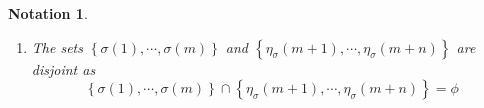 \documentclass[aps,preprint]{revtex4}%
\newtheorem{definition}[theorem]{Definition}
\newtheorem{notation}[theorem]{Notation}
\begin{document}
\begin{notation}
\begin{enumerate}
\begin{definition}
Disjoint Combinations $DC_{m,n}^{r}$ is the set of $n$-permutations $\sigma$
that produce \emph{disjoint sets} of $m$ \emph{ordered} objects $\left\{
\sigma\left(  1\right)  ,\cdots,\sigma\left(  m\right)  \right\}  $and $n$
\emph{ordered} objects $\left\{  \sigma\left(  m+1\right)  ,\cdots
,\sigma\left(  m+n\right)  \right\}  $ selected from a set of \emph{ordered}
$r$ objects and is defined by
\begin{align}
DC_{m,n}^{r}\left\{  \left\{  1,\cdots,r\right\}  \right\}   &  =\left\{
\left.  \overset{}{\left\{  \overset{}{\sigma\left(  1\right)  ,\cdots
,\sigma\left(  m\right)  }\right\}  ,\left\{  \overset{}{\left\{
1,\cdots,r\right\}  \ominus\left\{  \sigma\left(  1\right)  ,\cdots
,\sigma\left(  m\right)  \right\}  }\right\}  }\right\vert \sigma\in
S_{r}\right\} \\
&  =\left\{  \left.  \overset{}{\left\{  \overset{}{\sigma\left(  1\right)
,\cdots,\sigma\left(  m\right)  }\right\}  ,\left\{  \overset{}{\eta_{\sigma
}\left(  m+1\right)  ,\cdots,\eta_{\sigma}\left(  m+n\right)  }\right\}
}\right\vert \sigma,\eta_{\sigma}\in S_{r}\right\}  ,
\end{align}
i.e.
\begin{equation}
\left\{  \overset{}{\eta_{\sigma}\left(  m+1\right)  ,\cdots,\eta_{\sigma
}\left(  m+n\right)  }\right\}  =\left\{  \overset{}{\left\{  1,\cdots
,r\right\}  \ominus\left\{  \sigma\left(  1\right)  ,\cdots,\sigma\left(
m\right)  \right\}  }\right\}  .
\end{equation}

\end{definition}

\item The sets $\left\{  \sigma\left(  1\right)  ,\cdots,\sigma\left(
m\right)  \right\}  $ and $\left\{  \eta_{\sigma}\left(  m+1\right)
,\cdots,\eta_{\sigma}\left(  m+n\right)  \right\}  $ are disjoint as
\begin{equation}
\left\{  \sigma\left(  1\right)  ,\cdots,\sigma\left(  m\right)  \right\}
\cap\left\{  \eta_{\sigma}\left(  m+1\right)  ,\cdots,\eta_{\sigma}\left(
m+n\right)  \right\}  =\phi
\end{equation}



\end{enumerate}
\end{notation}
\end{document}
